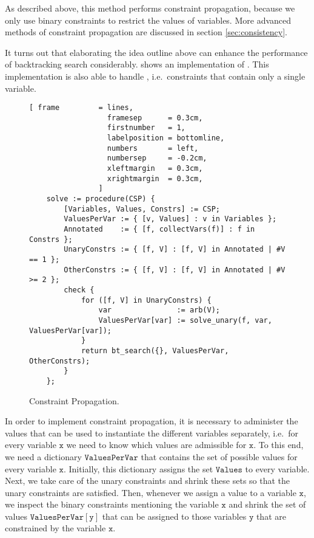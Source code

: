 As described above, this method performs  constraint propagation, because we only use binary
constraints to restrict the values of variables.  More advanced methods of constraint propagation are discussed
in section \ref{sec:consistency}.

It turns out that elaborating the idea outline above can enhance the performance of backtracking search
considerably.   shows an implementation of 
.  This implementation is also able to handle ,
i.e.~constraints that contain only a single variable.

\begin{figure}[!ht]
\centering
\begin{Verbatim}[ frame         = lines, 
                  framesep      = 0.3cm, 
                  firstnumber   = 1,
                  labelposition = bottomline,
                  numbers       = left,
                  numbersep     = -0.2cm,
                  xleftmargin   = 0.3cm,
                  xrightmargin  = 0.3cm,
                ]
    solve := procedure(CSP) {
        [Variables, Values, Constrs] := CSP;
        ValuesPerVar := { [v, Values] : v in Variables };
        Annotated    := { [f, collectVars(f)] : f in Constrs };
        UnaryConstrs := { [f, V] : [f, V] in Annotated | #V == 1 };
        OtherConstrs := { [f, V] : [f, V] in Annotated | #V >= 2 };
        check {
            for ([f, V] in UnaryConstrs) {
                var               := arb(V);
                ValuesPerVar[var] := solve_unary(f, var, ValuesPerVar[var]);
            }
            return bt_search({}, ValuesPerVar, OtherConstrs);
        }
    };
\end{Verbatim}
\vspace*{-0.3cm}
\caption{Constraint Propagation.}
\label{fig:csp-constraint-propagation.stlx-1}
\end{figure}

In order to implement constraint propagation, it is necessary to administer the values that can be used
to instantiate the different variables separately, i.e.~for every variable $\texttt{x}$ we need to know which
values are admissible for $\texttt{x}$.  To this end, we need a dictionary $\mathtt{ValuesPerVar}$ that
contains the set of possible values for every variable $\texttt{x}$.  Initially, this dictionary assigns the
set $\texttt{Values}$ to every variable.  Next, we take care of the unary constraints and shrink these sets so
that the unary constraints are satisfied.  Then, whenever we assign a value to a variable $\mathtt{x}$,  we
inspect the binary constraints mentioning the variable $\mathtt{x}$ and shrink the set of values
$\mathtt{ValuesPerVar}[\mathtt{y}]$ that can be assigned to those variables $\mathtt{y}$ that are constrained by the
variable  $\mathtt{x}$. 

